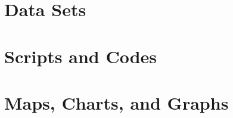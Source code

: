 \appendix
\renewcommand{\thefigure}{\Alph{chapter}\arabic{figure}}
\setcounter{figure}{0}
\chapter{Data Sets}
\chapter{Scripts and Codes}
\chapter{Maps, Charts, and Graphs}
